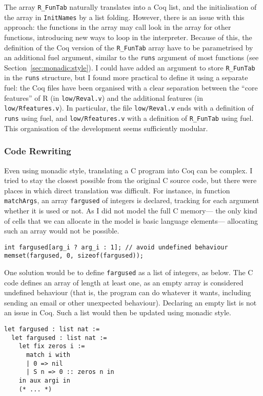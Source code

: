\documentclass{article}
\newcommand\Coq{Coq}
\newcommand\R{R}
\newcommand\Cn{C}
\begin{document}
The array \texttt{R_FunTab} naturally translates
into a \Coq{} list,
and the initialisation of the array in \texttt{InitNames}
by a list folding.
However, there is an issue with this approach:
the functions in the array may call look in the array
for other functions,
introducing new ways to loop in the interpreter.
Because of this, the definition of the \Coq{} version
of the \texttt{R_FunTab} array have to be parametrised
by an additional fuel argument,
similar to the \texttt{runs} argument of most functions
(see Section~\ref{sec:monadic:style}).
I could have added an argument to store \texttt{R_FunTab}
in the \texttt{runs} structure,
but I found more practical to define it using a separate fuel:
the \Coq{} files have been organised with a clear separation
between the “core features” of \R{}
(in \texttt{low/Reval.v})
and the additional features
(in \texttt{low/Rfeatures.v}).
In particular,
the file \texttt{low/Reval.v} ends with a definition of \texttt{runs} using fuel,
and \texttt{low/Rfeatures.v} with a definition of \texttt{R_FunTab} using fuel.
This organisation of the development seems sufficiently modular.


\subsubsection{Code Rewriting}
\label{sec:code:rewriting}

Even using monadic style,
translating a \Cn{} program into \Coq{} can be complex.
I tried to stay the closest possible from the original
\Cn{} source code,
but there were places in which direct translation was difficult.
For instance, in function \texttt{matchArgs},
an array \texttt{fargused} of integers is declared,
tracking for each argument whether it is used or not.
As I did not model the full \Cn{} memory—%
the only kind of cells that we can allocate in the model
is basic language elements—%
allocating such an array would not be possible.
\begin{verbatim}
int fargused[arg_i ? arg_i : 1]; // avoid undefined behaviour
memset(fargused, 0, sizeof(fargused));
\end{verbatim}

One solution would be to define \texttt{fargused}
as a list of integers, as below.
The \Cn{} code defines an array of length at least one,
as an empty array is considered undefined behaviour
(that is, the program can do whatever it wants,
including sending an email or other unexpected behaviour).
Declaring an empty list is not an issue in \Coq{}.
Such a list would then be updated using monadic style.
\begin{verbatim}
let fargused : list nat :=
  let fargused : list nat :=
    let fix zeros i :=
      match i with
      | 0 => nil
      | S n => 0 :: zeros n in
    in aux argi in
    (* ... *)
\end{verbatim}
\end{document}
